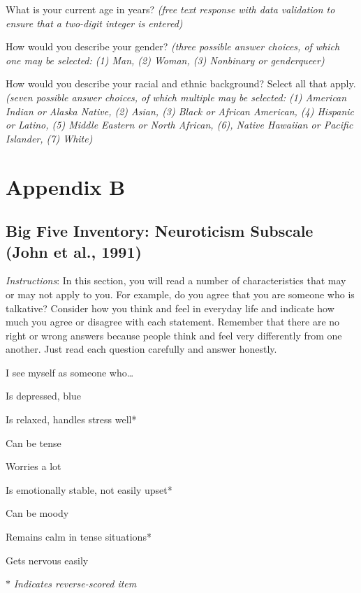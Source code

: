 \documentclass[
  english,
  man]{apa6}
\begin{document}
What is your current age in years? \emph{(free text response with data validation to ensure that a two-digit integer is entered)}

How would you describe your gender? \emph{(three possible answer choices, of which one may be selected: (1) Man, (2) Woman, (3) Nonbinary or genderqueer)}

How would you describe your racial and ethnic background? Select all that apply. \emph{(seven possible answer choices, of which multiple may be selected: (1) American Indian or Alaska Native, (2) Asian, (3) Black or African American, (4) Hispanic or Latino, (5) Middle Eastern or North African, (6), Native Hawaiian or Pacific Islander, (7) White)}

\newpage

\section{Appendix B}\label{appendix-b}

\subsection{Big Five Inventory: Neuroticism Subscale (John et al., 1991)}\label{big-five-inventory-neuroticism-subscale-john-et-al.-1991}

\emph{Instructions}: In this section, you will read a number of characteristics that may or may not apply to you. For example, do you agree that you are someone who is talkative? Consider how you think and feel in everyday life and indicate how much you agree or disagree with each statement. Remember that there are no right or wrong answers because people think and feel very differently from one another. Just read each question carefully and answer honestly.

I see myself as someone who\ldots{}

Is depressed, blue

Is relaxed, handles stress well*

Can be tense

Worries a lot

Is emotionally stable, not easily upset*

Can be moody

Remains calm in tense situations*

Gets nervous easily

\(*\) \emph{Indicates reverse-scored item}

\newpage
\end{document}
